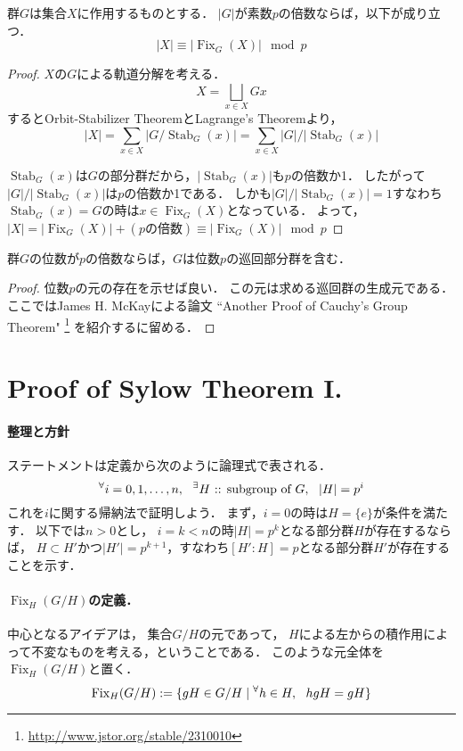 \documentclass[a4paper]{jsarticle}
\newcommand{\Stab}{\operatorname{Stab}}
\newcommand{\Fix}{\operatorname{Fix}}
\begin{document}
    \begin{Lemma}
        群$G$は集合$X$に作用するものとする．
        $|G|$が素数$p$の倍数ならば，以下が成り立つ．
        \[ |X| \equiv |\Fix_G(X)| \mod p\]
    \end{Lemma}
    \begin{proof}
        $X$の$G$による軌道分解を考える．
        \[ X= \bigsqcup_{x \in X}{Gx} \]
        するとOrbit-Stabilizer TheoremとLagrange's Theoremより，
        \[ |X| = \sum_{x \in X}{|G/ \Stab_G(x)|} = \sum_{x \in X}{|G|/|\Stab_G(x)|}\]

        $\Stab_G(x)$は$G$の部分群だから，$|\Stab_G(x)|$も$p$の倍数か1．
        したがって$|G|/|\Stab_G(x)|$は$p$の倍数か1である．
        しかも$|G|/|\Stab_G(x)|=1$すなわち$\Stab_G(x)=G$の時は$x \in \Fix_G(X)$となっている．
        よって，$|X|=|\Fix_G(X)|+(p\mbox{の倍数}) \equiv |\Fix_G(X)| \mod p$
        
    \end{proof}

    \begin{Thm}
        群$G$の位数が$p$の倍数ならば，$G$は位数$p$の巡回部分群を含む．
    \end{Thm}
    \begin{proof}
        位数$p$の元の存在を示せば良い．
        この元は求める巡回群の生成元である．
        ここではJames H. McKayによる論文
        ``Another Proof of Cauchy's Group Theorem"
        \footnote{\url{http://www.jstor.org/stable/2310010}}
        を紹介するに留める．
    \end{proof}

\section{Proof of Sylow Theorem I.}
    \paragraph{整理と方針}
    ステートメントは定義から次のように論理式で表される．
    \[ {}^{\forall} i=0,1,\dots,n,~~ {}^{\exists} H \text{ :: subgroup of }G,~~ |H|=p^i \]
    これを$i$に関する帰納法で証明しよう．
    まず，$i=0$の時は$H=\{e\}$が条件を満たす．
    以下では$n > 0$とし，
    $i=k<n$の時$|H|=p^k$となる部分群$H$が存在するならば，
    $H \subset H'$かつ$|H'|=p^{k+1}$，すなわち$[H':H]=p$となる部分群$H'$が存在することを示す．

    \paragraph{$\Fix_{H}(G/H)$の定義．}
    中心となるアイデアは，
    集合$G/H$の元であって，
    $H$による左からの積作用によって不変なものを考える，ということである．
    このような元全体を$\Fix_{H}(G/H)$と置く．
    \[
        \Fix_{H}(G/H) := \{ gH \in G/H \mid \Forall{h \in H} hgH=gH \}
    \]
\end{document}
